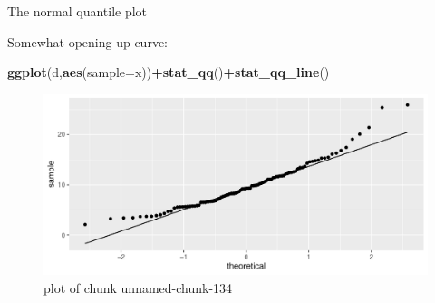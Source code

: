 \documentclass[ignorenonframetext,]{beamer}
\newenvironment{Shaded}{\begin{snugshade}}{\end{snugshade}}
\newcommand{\DataTypeTok}[1]{\textcolor[rgb]{0.13,0.29,0.53}{#1}}
\newcommand{\KeywordTok}[1]{\textcolor[rgb]{0.13,0.29,0.53}{\textbf{#1}}}
\newcommand{\NormalTok}[1]{#1}
\newcommand{\OperatorTok}[1]{\textcolor[rgb]{0.81,0.36,0.00}{\textbf{#1}}}
\begin{document}
\begin{frame}[fragile]{The normal quantile plot}
\protect\hypertarget{the-normal-quantile-plot-3}{}

Somewhat opening-up curve:

\begin{Shaded}
\begin{Highlighting}[]
\KeywordTok{ggplot}\NormalTok{(d,}\KeywordTok{aes}\NormalTok{(}\DataTypeTok{sample=}\NormalTok{x))}\OperatorTok{+}\KeywordTok{stat_qq}\NormalTok{()}\OperatorTok{+}\KeywordTok{stat_qq_line}\NormalTok{()}
\end{Highlighting}
\end{Shaded}

\begin{figure}
\centering
\includegraphics{figure/unnamed-chunk-134-1.pdf}
\caption{plot of chunk unnamed-chunk-134}
\end{figure}

\end{frame}
\end{document}

